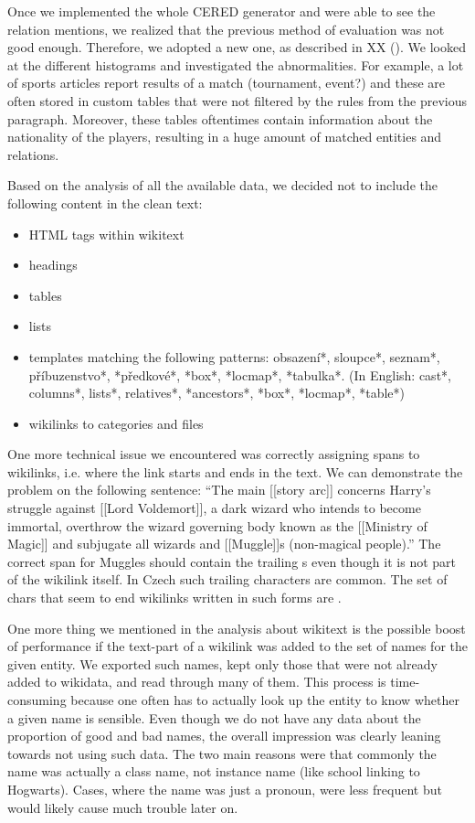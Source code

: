 Once we implemented the whole CERED generator and were able to see the relation mentions, we realized that the previous method of evaluation was not good enough. Therefore, we adopted a new one, as described in XX (). We looked at the different histograms and investigated the abnormalities. For example, a lot of sports articles report results of a match (tournament, event?) and these are often stored in custom tables that were not filtered by the rules from the previous paragraph. Moreover, these tables oftentimes contain information about the nationality of the players, resulting in a huge amount of matched entities and relations.

Based on the analysis of all the available data, we decided not to include the following content in the clean text:
\begin{itemize}

\item HTML tags within wikitext
\item headings
\item tables
\item lists
\item templates matching the following patterns: obsazení*, sloupce*, seznam*, příbuzenstvo*, *předkové*, *box*, *locmap*, *tabulka*. (In English: cast*, columns*, lists*, relatives*, *ancestors*, *box*, *locmap*, *table*)
\item wikilinks to categories and files

\end{itemize}

One more technical issue we encountered was correctly assigning spans to wikilinks, i.e. where the link starts and ends in the text. We can demonstrate the problem on the following sentence: “The main [[story arc]] concerns Harry's struggle against [[Lord Voldemort]], a dark wizard who intends to become immortal, overthrow the wizard governing body known as the [[Ministry of Magic]] and subjugate all wizards and [[Muggle]]s (non-magical people).” The correct span for Muggles should contain the trailing s even though it is not part of the wikilink itself. In Czech such trailing characters are common. The set of chars that seem to end wikilinks written in such forms are . 

One more thing we mentioned in the analysis about wikitext is the possible boost of performance if the text-part of a wikilink was added to the set of names for the given entity. We exported such names, kept only those that were not already added to wikidata, and read through many of them. This process is time-consuming because one often has to actually look up the entity to know whether a given name is sensible. Even though we do not have any data about the proportion of good and bad names, the overall impression was clearly leaning towards not using such data. The two main reasons were that commonly the name was actually a class name, not instance name (like school linking to Hogwarts). Cases, where the name was just a pronoun, were less frequent but would likely cause much trouble later on.

